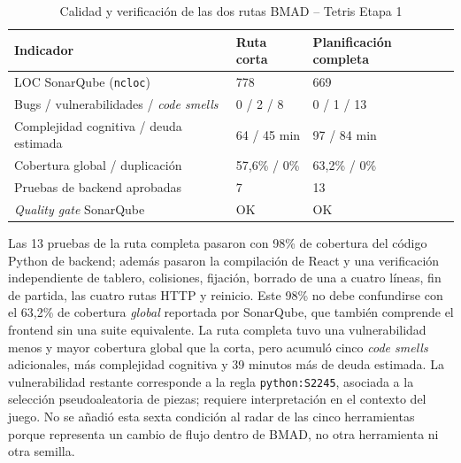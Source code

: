 \begin{table}[H]
\centering
\caption{Calidad y verificación de las dos rutas BMAD -- Tetris Etapa 1}
\label{tab:bmad_calidad_rutas_tetris_init}
\small
\begin{tabularx}{\textwidth}{l Y Y}
\toprule
\textbf{Indicador} & \textbf{Ruta corta} & \textbf{Planificación completa} \\
\midrule
LOC SonarQube (\texttt{ncloc}) & 778 & 669 \\
Bugs / vulnerabilidades / \textit{code smells} & 0 / 2 / 8 & 0 / 1 / 13 \\
Complejidad cognitiva / deuda estimada & 64 / 45 min & 97 / 84 min \\
Cobertura global / duplicación & 57,6\% / 0\% & 63,2\% / 0\% \\
Pruebas de backend aprobadas & 7 & 13 \\
\textit{Quality gate} SonarQube & OK & OK \\
\bottomrule
\end{tabularx}
\end{table}

Las 13 pruebas de la ruta completa pasaron con 98\% de cobertura del código Python de backend; además pasaron la compilación de React y una verificación independiente de tablero, colisiones, fijación, borrado de una a cuatro líneas, fin de partida, las cuatro rutas HTTP y reinicio. Este 98\% no debe confundirse con el 63,2\% de cobertura \emph{global} reportada por SonarQube, que también comprende el frontend sin una suite equivalente. La ruta completa tuvo una vulnerabilidad menos y mayor cobertura global que la corta, pero acumuló cinco \textit{code smells} adicionales, más complejidad cognitiva y 39 minutos más de deuda estimada. La vulnerabilidad restante corresponde a la regla \texttt{python:S2245}, asociada a la selección pseudoaleatoria de piezas; requiere interpretación en el contexto del juego. No se añadió esta sexta condición al radar de las cinco herramientas porque representa un cambio de flujo dentro de BMAD, no otra herramienta ni otra semilla.

